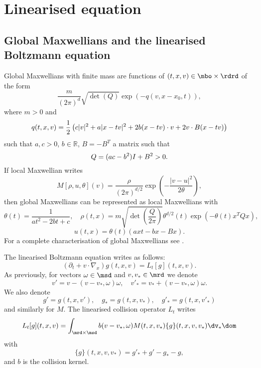 \section{Linearised equation} %
\label{sec:linearised_equation}
 \subsection{Global Maxwellians and the linearised Boltzmann equation} %
 \label{ssec:global_maxwellians}
 
Global Maxwellians with finite mass are functions of $(t,x,v)\in \mbo\times\rdrd$ of the form
\begin{equation}
	\frac{m}{(2\pi)^{d}}\sqrt{\det(Q)}\exp(-q(v,x-x_0,t)),
	\label{levermore}
\end{equation}
where $m>0$ and \begin{equation}
	\notag
	q(t,x,v)=\frac{1}{2}\left(c|v|^2+a|x-tv|^2+2b(x-tv)\cdot v+2v\cdot B(x-tv)\right)
\end{equation}
such that $a,c>0$, $b\in \mathbb R$, $B=-B^T$ a matrix such that \begin{equation}
	\notag
Q=(ac-b^2)I+B^2>0.	
\end{equation}
If local Maxwellian writes 
\[M[\rho,u,\theta](v)=\frac{\rho}{(2 \pi)^{d/2}}\exp\left(-\frac{|v-u|^2}{2 \theta}\right),\]
then global Maxwellians can be represented as local Maxwellians with
 \begin{equation}\label{eq:locals}
 	\theta(t)=\frac{1}{ at^2-2bt+c },\quad \rho(t,x)=m \sqrt{\det\left(\frac{Q}{2 \pi}\right)}\theta^{d/2}(t)\exp(-\theta(t)x^{T}Qx),
 \end{equation}
\[u(t,x)=\theta(t)(axt-bx-Bx).\]
For a complete characterisation of global Maxwellians see \cite{CDL-GlM}.

The linearised Boltzmann equation writes as follows:
\begin{equation}\label{eq:theone}
	(\partial_t + v\cdot \nabla_x)g(t,x,v)=L_t[g](t,x,v).
\end{equation}
As previously, for vectors $\omega\in\msd $ and $v,v_*\in\mrd$ we denote
\[v'=v-(v-v_*,\omega)\omega,\quad v'_*=v_*+(v-v_*,\omega)\omega.\]
We also denote \[g'=g(t,x,v'),\quad g_*=g(t,x,v_*),\quad g'_*=g(t,x,v'_*)\]
and similarly for $M$.
 The linearised collision operator $L_t$ writes  
\[L_t[g](t,x,v) = \int_{\mrd\times\msd}b(v-v_*,\omega)M(t,x,v_*)\{g\}(t,x,v,v_*)\dv_*\dom\]
with \[\{g\}(t,x,v,v_*) = g'_*+g'- g_*-g,  \]
and $b$ is the collision kernel.

